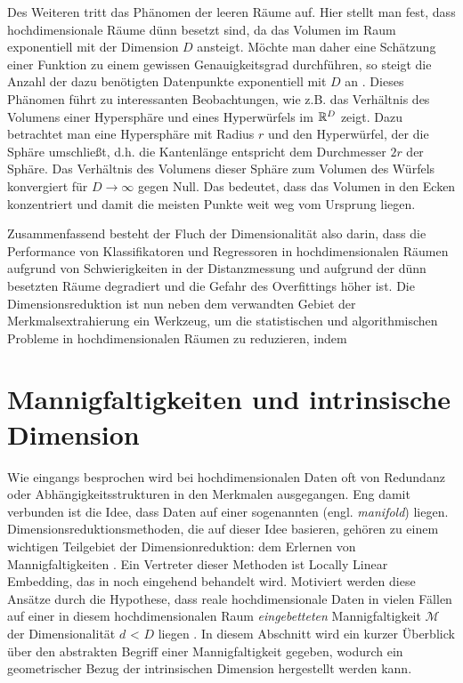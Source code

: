 Des Weiteren tritt das Phänomen der leeren Räume auf. Hier stellt man fest, dass hochdimensionale
Räume dünn besetzt sind, da das Volumen im Raum exponentiell mit der Dimension $D$ ansteigt. Möchte
man daher eine Schätzung einer Funktion zu einem gewissen Genauigkeitsgrad durchführen, so steigt
die Anzahl der dazu benötigten Datenpunkte exponentiell mit $D$ an \parencite[6]{Lee.2007}. Dieses Phänomen führt zu interessanten Beobachtungen, wie z.B. das Verhältnis
des Volumens einer Hypersphäre und eines Hyperwürfels im $\mathbb{R}^D$ zeigt. Dazu betrachtet man eine
Hypersphäre mit Radius $r$ und den Hyperwürfel, der die Sphäre umschließt, d.h. die Kantenlänge
entspricht dem Durchmesser $2r$ der Sphäre. Das Verhältnis des Volumens dieser Sphäre zum Volumen
des Würfels konvergiert für $D \rightarrow \infty$ gegen Null. Das bedeutet, dass das Volumen in
den Ecken konzentriert \parencite[6 -- 7]{Lee.2007} und damit die meisten Punkte weit weg vom Ursprung liegen.

Zusammenfassend besteht der Fluch der Dimensionalität also darin, dass die Performance von
Klassifikatoren und Regressoren in hochdimensionalen Räumen aufgrund von Schwierigkeiten in der
Distanzmessung und aufgrund der dünn besetzten Räume degradiert und die Gefahr des Overfittings
höher ist. Die Dimensionsreduktion ist nun neben dem verwandten Gebiet der Merkmalsextrahierung ein
Werkzeug, um die statistischen und algorithmischen Probleme in hochdimensionalen Räumen zu
reduzieren, indem

\section{Mannigfaltigkeiten und intrinsische Dimension}
\label{ch:Dimensionsreduktion:MannigfaltigkeitenIntrinsDim}

Wie eingangs besprochen wird bei hochdimensionalen Daten oft von Redundanz oder
Abhängigkeitsstrukturen in den Merkmalen ausgegangen. Eng damit verbunden ist die Idee, dass Daten
auf einer sogenannten  (engl. \textit{manifold}) liegen.
Dimensionsreduktionsmethoden, die auf dieser Idee basieren, gehören zu einem wichtigen Teilgebiet
der Dimensionreduktion: dem Erlernen von Mannigfaltigkeiten \parencite{Cayton.2005}. Ein Vertreter dieser Methoden ist Locally Linear Embedding, das in
 noch eingehend behandelt wird. Motiviert werden
diese Ansätze durch die Hypothese, dass reale hochdimensionale Daten in vielen Fällen auf einer in
diesem hochdimensionalen Raum \textit{eingebetteten} Mannigfaltigkeit $\mathcal{M}$ der
Dimensionalität $d$ < $D$ liegen \parencite[vgl.][1]{Cayton.2005}. In diesem Abschnitt wird ein kurzer Überblick über den abstrakten
Begriff einer Mannigfaltigkeit gegeben, wodurch ein geometrischer Bezug der intrinsischen Dimension
hergestellt werden kann.

